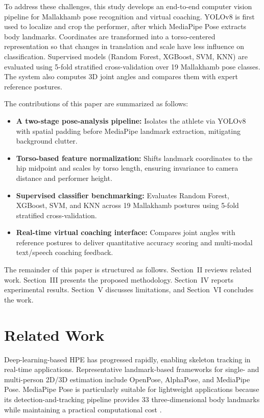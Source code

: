 \documentclass{ieeeaccess}
\begin{document}
To address these challenges, this study develops an end-to-end computer vision pipeline for Mallakhamb pose recognition and virtual coaching. YOLOv8 is first used to localize and crop the performer, after which MediaPipe Pose extracts body landmarks. Coordinates are transformed into a torso-centered representation so that changes in translation and scale have less influence on classification. Supervised models (Random Forest, XGBoost, SVM, KNN) are evaluated using 5-fold stratified cross-validation over 19 Mallakhamb pose classes. The system also computes 3D joint angles and compares them with expert reference postures.

The contributions of this paper are summarized as follows:
\begin{itemize}
    \item \textbf{A two-stage pose-analysis pipeline:} Isolates the athlete via YOLOv8 with spatial padding before MediaPipe landmark extraction, mitigating background clutter.
    \item \textbf{Torso-based feature normalization:} Shifts landmark coordinates to the hip midpoint and scales by torso length, ensuring invariance to camera distance and performer height.
    \item \textbf{Supervised classifier benchmarking:} Evaluates Random Forest, XGBoost, SVM, and KNN across 19 Mallakhamb postures using 5-fold stratified cross-validation.
    \item \textbf{Real-time virtual coaching interface:} Compares joint angles with reference postures to deliver quantitative accuracy scoring and multi-modal text/speech coaching feedback.
\end{itemize}

The remainder of this paper is structured as follows. Section~II reviews related work. Section~III presents the proposed methodology. Section~IV reports experimental results. Section~V discusses limitations, and Section~VI concludes the work.

\section{Related Work}

Deep-learning-based HPE has progressed rapidly, enabling skeleton tracking in real-time applications. Representative landmark-based frameworks for single- and multi-person 2D/3D estimation include OpenPose, AlphaPose, and MediaPipe Pose. MediaPipe Pose is particularly suitable for lightweight applications because its detection-and-tracking pipeline provides 33 three-dimensional body landmarks while maintaining a practical computational cost \cite{b1,b2,b3,b12,b13,b14,b15,b16}.
\end{document}
